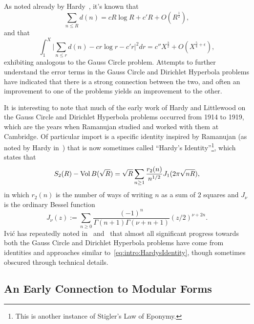 As noted already by Hardy~\cite{Hardy1917}, it's known that
\begin{equation}
  \sum_{n \leq R} d(n) = cR \log R + c' R + O(R^{\frac{1}{2}}),
\end{equation}
and that
\begin{equation}
  \int_1^X \Big\lvert \sum_{n \leq r} d(n) - c r \log r - c' r \Big\rvert^2 dr = c'' X^{\frac{3}{2}} +
  O(X^{\frac{5}{4} + \epsilon}),
\end{equation}
exhibiting analogous to the Gauss Circle problem.
Attempts to further understand the error terms in the Gauss Circle and Dirichlet Hyperbola
problems have indicated that there is a strong connection between the two, and often an
improvement to one of the problems yields an improvement to the other.


It is interesting to note that much of the early work of Hardy and Littlewood on
the Gauss Circle and Dirichlet Hyperbola problems occurred from 1914 to 1919, which are
the years when Ramanujan studied and worked with them at Cambridge.
Of particular import is a specific identity inspired by Ramanujan (as noted by Hardy
in~\cite{Hardy1959onRamanujan}) that is now sometimes called ``Hardy's
Identity''\footnote{This is another instance of Stigler's Law of Eponymy.},
which states that
\begin{equation}\label{eq:intro:HardysIdentity}
  S_2(R) - \operatorname*{Vol} B(\sqrt R) =  \sqrt{R} \sum_{n \geq 1} \frac{r_2(n)}{n^{1/2}} J_1(2\pi
  \sqrt{n R}),
\end{equation}
in which $r_2(n)$ is the number of ways of writing $n$ as a sum of $2$ squares and $J_\nu$ is
the ordinary Bessel function
\begin{equation}
  J_\nu(z) := \sum_{n \geq 0} \frac{(-1)^n}{\Gamma(n+1) \Gamma(\nu + n + 1)}
  (z/2)^{\nu + 2n}.
\end{equation}
Ivi\'c has repeatedly noted in~\cite{ivic2004lattice} and~\cite{ivic1996} that  almost all
significant progress towards both the Gauss Circle and Dirichlet Hyperbola problems have
come from identities and approaches similar to~\eqref{eq:intro:HardysIdentity}, though
sometimes obscured through technical details.





\subsection{An Early Connection to Modular Forms}


